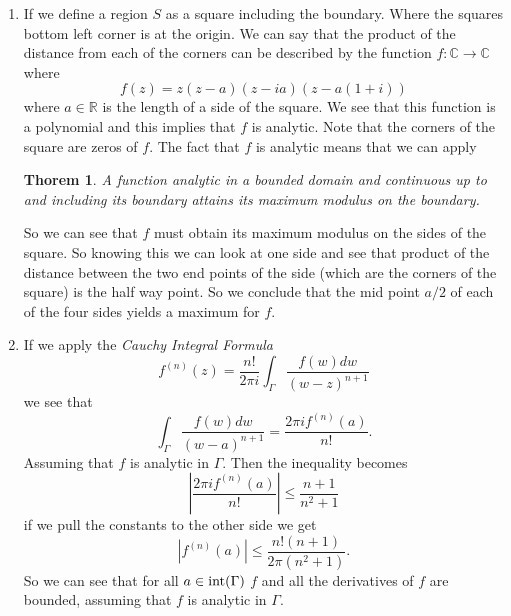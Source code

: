 \documentclass[11pt]{article}
\newcommand{\CC}{\mathbb{C}}
\newcommand{\RR}{\mathbb{R}}
\begin{document}
\begin{enumerate}
\begin{enumerate}
\item  
No sequence of functions $\{f_n(z)\}_{n\ge1}$ continuous in a set $S$ can converge to a function $f(z)$ on all of $S$ except at one point $a$, such that $f(z)$ is not continuous at $a$. Due to  
\newtheorem{lema}{Lemma}
\begin{lema}
Let $f_n$ be a sequence of functions continuous on a set $T\subset \CC$ and converging uniformly to $f$ on $T$. Then $f$ is also continuous on $T$.
\end{lema}
\end{enumerate}

\item  
If we define a region $S$ as a square including the boundary. Where the squares bottom left corner is at the origin. We can say that the product of the distance from each of the corners can be described by the function $f:\CC\rightarrow\CC$ where
$$f(z) = z(z-a)(z-ia)(z-a(1+i))$$ 
where $a\in\RR$ is the length of a side of the square. We see that this function is a polynomial and this implies that $f$ is analytic. Note that the corners of the square are zeros of $f$. The fact that $f$ is analytic means that we can apply
\newtheorem{theo}{Thorem}
\begin{theo}
A function analytic in a bounded domain and continuous up to and including its boundary attains its maximum modulus on the boundary.
\end{theo}
 So we can see that $f$ must obtain its maximum modulus on the sides of the square. So knowing this we can look at one side and see that product of the distance between the two end points of the side (which are the corners of the square) is the half way point. So we conclude that the mid point $a/2$ of each of the four sides yields a maximum for $f$.

\item  
If we apply the \emph{Cauchy Integral Formula} 
$$f^{(n)}(z) = \frac{n!}{2\pi i}\int_{\Gamma}\frac{f(w)dw}{(w-z)^{n+1}}$$
we see that
$$\int_{\Gamma}\frac{f(w)dw}{(w-a)^{n+1}} = \frac{2\pi if^{(n)}(a)}{n!}.$$
Assuming that $f$ is analytic in $\Gamma$. Then the inequality becomes
$$\left|\frac{2\pi if^{(n)}(a)}{n!}\right| \le \frac{n+1}{n^2+1}$$
if we pull the constants to the other side we get
$$\left|f^{(n)}(a)\right| \le \frac{n!(n+1)}{2\pi(n^2+1)}.$$
So we can see that for all $a\in\textnormal{int}(\Gamma)$ $f$ and all the derivatives of $f$ are bounded, assuming that $f$ is analytic in $\Gamma$.
\end{enumerate}
\end{document}
